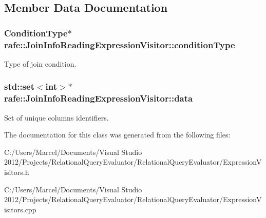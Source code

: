 \subsection{Member Data Documentation}
\hypertarget{classrafe_1_1_join_info_reading_expression_visitor_a76585d743cb5babfeca7bd239bc01fca}{
\subsubsection[{condition\+Type}]{\setlength{\rightskip}{0pt plus 5cm}Condition\+Type$\ast$ rafe\+::\+Join\+Info\+Reading\+Expression\+Visitor\+::condition\+Type}}\label{classrafe_1_1_join_info_reading_expression_visitor_a76585d743cb5babfeca7bd239bc01fca}
Type of join condition. \hypertarget{classrafe_1_1_join_info_reading_expression_visitor_a9e734526bd1f92d980024ce0dbed65ba}{
\subsubsection[{data}]{\setlength{\rightskip}{0pt plus 5cm}std\+::set$<$int$>$$\ast$ rafe\+::\+Join\+Info\+Reading\+Expression\+Visitor\+::data}}\label{classrafe_1_1_join_info_reading_expression_visitor_a9e734526bd1f92d980024ce0dbed65ba}
Set of unique columns identifiers. 

The documentation for this class was generated from the following files\+:\begin{DoxyCompactItemize}
\item 
C\+:/\+Users/\+Marcel/\+Documents/\+Visual Studio 2012/\+Projects/\+Relational\+Query\+Evaluator/\+Relational\+Query\+Evaluator/Expression\+Visitors.\+h\item 
C\+:/\+Users/\+Marcel/\+Documents/\+Visual Studio 2012/\+Projects/\+Relational\+Query\+Evaluator/\+Relational\+Query\+Evaluator/Expression\+Visitors.\+cpp\end{DoxyCompactItemize}
